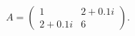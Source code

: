 \documentclass{article}
\begin{document}
  \begin{equation}
    A=\begin{pmatrix}
        1 &2+0.1i\nonumber\\
        2+0.1i&6
      \end{pmatrix}.\nonumber
\nonumber  \end{equation}
\end{document}
